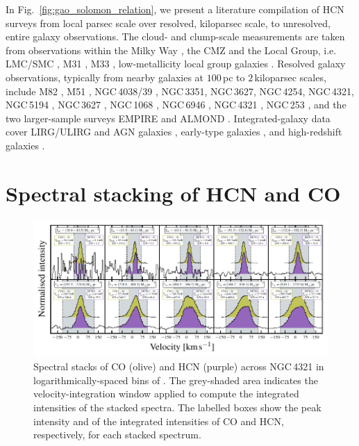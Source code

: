 \documentclass[letter, longauth]{aa} %
\begin{document}
\begin{appendix}
In Fig.~\ref{fig:gao_solomon_relation}, we present a literature compilation of HCN surveys from local parsec scale over resolved, kiloparsec scale, to unresolved, entire galaxy observations.
The cloud- and clump-scale measurements are taken from observations within the Milky Way \citep{Wu2010, Lada2012, Evans2014, Stephens2016}, the CMZ \citep{Jones2012, Barnes2017} and the Local Group, i.e. LMC/SMC \citep{Chin1997, Chin1998}, M31 \citep{Brouillet2005}, M33 \citep{Buchbender2013}, low-metallicity local group galaxies \citep{Braine2017}.
Resolved galaxy observations, typically from nearby galaxies at $100\,$pc to $2\,$kiloparsec scales, include M82 \citep{Kepley2014}, M51 \citep{Usero2015, Chen2017, Querejeta2019, Stuber2023}, NGC\,4038/39 \citep{Bigiel2015}, NGC\,3351, NGC\,3627, NGC\,4254, NGC\,4321, NGC\,5194 \citep{Gallagher2018a}, NGC\,3627 \citep{Beslic2021}, NGC\,1068 \citep{Sanchez-Garcia2022}, NGC\,6946 \citep{Eibensteiner2022}, NGC\,4321 \citep{Neumann2024}, NGC\,253 \citep{Beslic2024}, and the two larger-sample surveys EMPIRE \citep[nine galaxies; ][]{Jimenez-Donaire2019} and ALMOND \citep[25 galaxies; ][]{Neumann2023a}.
Integrated-galaxy data cover LIRG/ULIRG and AGN galaxies \citep{Krips2008, Gracia-Carpio2008, Juneau2009, Garcia-Burillo2012, Privon2015}, early-type galaxies \citep{Crocker2012}, and high-redshift galaxies \citep{Gao2007, Rybak2022}.

\section{Spectral stacking of HCN and CO}
\label{sec:app:stacking}

\begin{figure}
\centering
\includegraphics[width=\textwidth]{Figures/ngc4321_almond_stacked_spectra_via_INT_VAL_SD_STAR_compressed.pdf}
\caption{Spectral stacks of CO (olive) and HCN (purple) across NGC\,4321 in logarithmically-spaced bins of \sigstar. The grey-shaded area indicates the velocity-integration window applied to compute the integrated intensities of the stacked spectra. The labelled boxes show the peak intensity and \snr of the integrated intensities of CO and HCN, respectively, for each stacked spectrum.}
\label{fig:ngc4321_stacks}
\end{figure}


\end{appendix}
\end{document}
